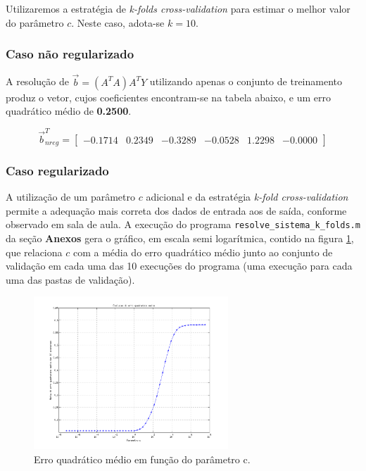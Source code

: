 \vspace{12pt}

Utilizaremos a estratégia de \textit{k-folds cross-validation} para estimar o
melhor valor do parâmetro \(c\). Neste caso, adota-se \(k=10\).

\subsubsection{Caso não regularizado}

A resolução de \(\overrightarrow{b} = \left( A^T A \right) A^T
Y\) utilizando apenas o conjunto de treinamento produz o vetor, cujos
coeficientes encontram-se na tabela abaixo, e um erro quadrático médio de
\textbf{0.2500}.

\[
\overrightarrow{b}_{nreg}^T = \begin{bmatrix}
  -0.1714 & 0.2349 & -0.3289 & -0.0528 & 1.2298 & -0.0000
  \end{bmatrix}
\]

\FloatBarrier
\subsubsection{Caso regularizado}

A utilização de um parâmetro \(c\) adicional e da estratégia \textit{k-fold
cross-validation} permite a adequação mais correta dos dados de entrada aos de
saída, conforme observado em sala de aula. A execução do programa
\texttt{resolve\_sistema\_k\_folds.m} da seção \textbf{Anexos} gera o gráfico,
em escala semi logarítmica, contido na figura \ref{fig:pred.regula}, que
relaciona \(c\) com a média do erro quadrático médio junto ao conjunto de
validação em cada uma das 10 execuções do programa (uma execução para cada uma
das pastas de validação).

	\begin{figure}[H]
	  \centering
	  \includegraphics[width=0.65\textwidth]{image/preditor_regularizado_k_folds}
	  \caption{Erro quadrático médio em função do parâmetro c.} 
	  \label{fig:pred.regula}
	\end{figure}
	

